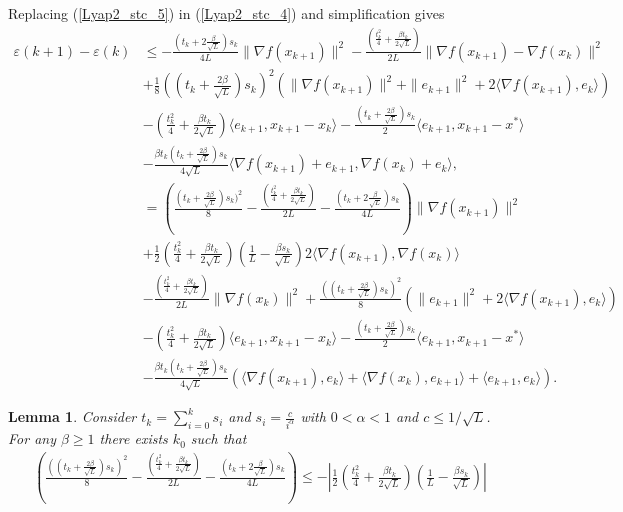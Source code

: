 \documentclass{article}
\theoremstyle{plain}
\newtheorem{lemma}[theorem]{Lemma}
\theoremstyle{definition}
\theoremstyle{remark}
\begin{document}
        Replacing (\ref{Lyap2_stc_5}) in (\ref{Lyap2_stc_4}) and simplification gives
        \begin{align}\label{Lyap2_stc_6}
            \varepsilon(k+1)-\varepsilon(k)&\leq -\frac{(t_k+2\frac{\beta}{\sqrt{L}})s_k}{4L} \|\nabla f(x_{k+1})\|^2-\frac{(\frac{t_{k}^2}{4}+\frac{\beta t_{k}}{2\sqrt{L}})}{2L}\|\nabla f(x_{k+1})-\nabla f(x_k)\|^2\nonumber\\
            &+\frac{1}{8}((t_k+\frac{2\beta}{\sqrt{L}})s_k)^2(\|\nabla f(x_{k+1})\|^2+\|e_{k+1}\|^2+2\langle \nabla f(x_{k+1}) ,e_k \rangle) \nonumber\\
            & -(\frac{t_k^2}{4}+\frac{\beta t_k}{2\sqrt{L}})\langle e_{k+1},x_{k+1}-x_k\rangle-\frac{(t_k+\tfrac{2\beta}{\sqrt{L}})s_k}{2}\langle e_{k+1},x_{k+1}-x^*\rangle\nonumber\\
         & -\frac{\beta t_k(t_k+\frac{2\beta}{\sqrt{L}})s_k}{4\sqrt{L}}\langle \nabla f(x_{k+1})+e_{k+1}, \nabla f(x_k)+e_k \rangle,\nonumber\\
         &=\left( \frac{(t_k+\frac{2\beta}{\sqrt{L}})s_k)^2}{8}- \frac{(\frac{t_{k}^2}{4}+\frac{\beta t_{k}}{2\sqrt{L}})}{2L}- \frac{(t_k+2\frac{\beta}{\sqrt{L}})s_k}{4L}\right)\|\nabla f(x_{k+1})\|^2\nonumber\\
         &+\frac{1}{2}\left(\frac{t_k^2}{4}+\frac{\beta t_k}{2\sqrt{L}} \right)(\frac{1}{L}-\frac{\beta s_k}{\sqrt{L}}) 2\langle \nabla f(x_{k+1}),\nabla f(x_k) \rangle\nonumber\\
         &-\frac{(\frac{t_{k}^2}{4}+\frac{\beta t_{k}}{2\sqrt{L}})}{2L}\|\nabla f(x_k)\|^2+\frac{((t_k+\frac{2\beta}{\sqrt{L}})s_k)^2}{8}(\|e_{k+1}\|^2+2\langle \nabla f(x_{k+1}) ,e_k \rangle)\nonumber\\
         & -(\frac{t_k^2}{4}+\frac{\beta t_k}{2\sqrt{L}})\langle e_{k+1},x_{k+1}-x_k\rangle-\frac{(t_k+\tfrac{2\beta}{\sqrt{L}})s_k}{2}\langle e_{k+1},x_{k+1}-x^*\rangle\nonumber\\
         &-\frac{\beta t_k(t_k+\frac{2\beta}{\sqrt{L}})s_k}{4\sqrt{L}}\left(\langle \nabla f(x_{k+1}),e_k \rangle+\langle \nabla f(x_{k}) , e_{k+1}\rangle+\langle e_{k+1},e_k\rangle\right).
        \end{align}
        \begin{lemma}\label{lem1}
            Consider $t_k=\sum_{i=0}^k s_i$ and $s_i=\frac{c}{i^{\alpha}}$ with $0<\alpha<1$ and $c\leq 1/\sqrt{L}$. For any $\beta\geq 1$ there exists $k_0$ such that 
            \begin{align}\label{lem1_eqn1}
                \left( \frac{((t_k+\frac{2\beta}{\sqrt{L}})s_k)^2}{8}- \frac{(\frac{t_{k}^2}{4}+\frac{\beta t_{k}}{2\sqrt{L}})}{2L}- \frac{(t_k+2\frac{\beta}{\sqrt{L}})s_k}{4L}\right)\leq -\left|\frac{1}{2}\left(\frac{t_k^2}{4}+\frac{\beta t_k}{2\sqrt{L}} \right)(\frac{1}{L}-\frac{\beta s_k}{\sqrt{L}})\right|
            \end{align}
        \end{lemma}
\end{document}
